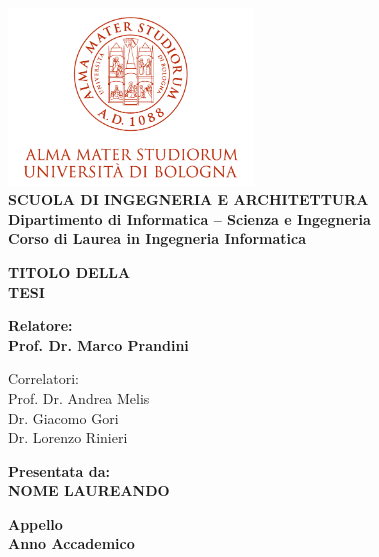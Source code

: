 \begin{titlepage}
\begin{center}
\includegraphics[width=2.56in]{figures/logo/logo_unibo.png}\\
\vspace{5mm}
{\small{\bf SCUOLA DI INGEGNERIA E ARCHITETTURA\\
\vspace{2mm}
Dipartimento di Informatica -- Scienza e Ingegneria\\
\vspace{2mm}
Corso di Laurea in Ingegneria Informatica }}
\end{center}
\vspace{11.9mm}
\begin{center}
{\LARGE{\bf TITOLO DELLA\\
\vspace{5mm}
TESI}}
\end{center}
\vspace{11.9mm}
\par
\noindent
\begin{minipage}[t]{0.47\textwidth}
{\normalsize{\bf Relatore:\\
Prof. Dr. Marco Prandini

\vspace{5mm}
Correlatori:\\
Prof. Dr. Andrea Melis\\
Dr. Giacomo Gori\\
Dr. Lorenzo Rinieri\\
}}
\end{minipage}
\hfill
\begin{minipage}[t]{0.47\textwidth}\raggedleft
{\normalsize{\bf Presentata da:\\
NOME LAUREANDO}}
\end{minipage}
\vspace{10mm} %
\begin{center}
{\normalsize{\bf Appello \\%
Anno Accademico }}%
\end{center}
\end{titlepage}
